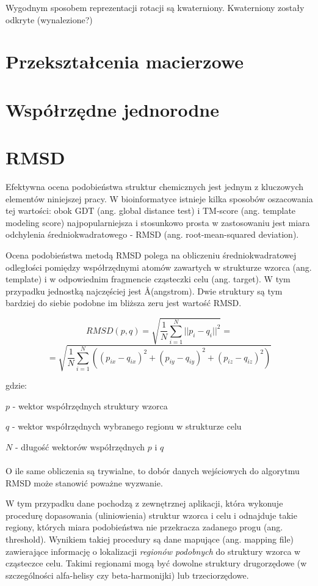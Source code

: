 \documentclass[licencjacka]{pracamgr}
\begin{document}
Wygodnym sposobem reprezentacji rotacji są kwaterniony. Kwaterniony zostały odkryte (wynalezione?) 

\section{Przekształcenia macierzowe}



\section{Współrzędne jednorodne}




\section{RMSD}
Efektywna ocena podobieństwa struktur chemicznych jest jednym z kluczowych elementów niniejszej pracy. W bioinformatyce istnieje kilka sposobów oszacowania tej wartości: obok GDT (ang. global distance test) i TM-score (ang. template modeling score) najpopularniejsza i stosunkowo prosta w zastosowaniu jest miara odchylenia średniokwadratowego - RMSD (ang. root-mean-squared deviation). 

Ocena podobieństwa metodą RMSD polega na obliczeniu średniokwadratowej odległości pomiędzy współrzędnymi atomów zawartych w strukturze wzorca (ang. template) i w odpowiednim fragmencie cząsteczki celu (ang. target). W tym przypadku jednostką najczęściej jest \AA (angstrom). Dwie struktury są tym bardziej do siebie podobne im bliższa zeru jest wartość RMSD.


$$
RMSD(p,q) = \sqrt{\frac{1}{N}\sum_{i=1}^{N}||p_i-q_i||^{2}} = 
$$
$$ 
= \sqrt{\frac{1}{N}\sum_{i=1}^{N}((p_{ix}-q_{ix})^{2}+(p_{iy}-q_{iy})^{2}+(p_{iz}-q_{iz})^{2})}
$$

gdzie:

$p$ - wektor współrzędnych struktury wzorca

$q$ - wektor współrzędnych wybranego regionu w strukturze celu

$N$ - długość wektorów współrzędnych $p$ i $q$
\\
\\
O ile same obliczenia są trywialne, to dobór danych wejściowych do algorytmu RMSD może stanowić poważne wyzwanie. 

W tym przypadku dane pochodzą z zewnętrznej aplikacji, która wykonuje procedurę dopasowania (uliniowienia) struktur wzorca i celu i odnajduje takie regiony, których miara podobieństwa nie przekracza zadanego progu (ang. threshold). Wynikiem takiej procedury są dane mapujące (ang. mapping file) zawierające informację o lokalizacji \textit{regionów podobnych} do struktury wzorca w cząsteczce celu. Takimi regionami mogą być dowolne struktury drugorzędowe (w szczególności alfa-helisy czy beta-harmonijki) lub trzeciorzędowe.
\end{document}
